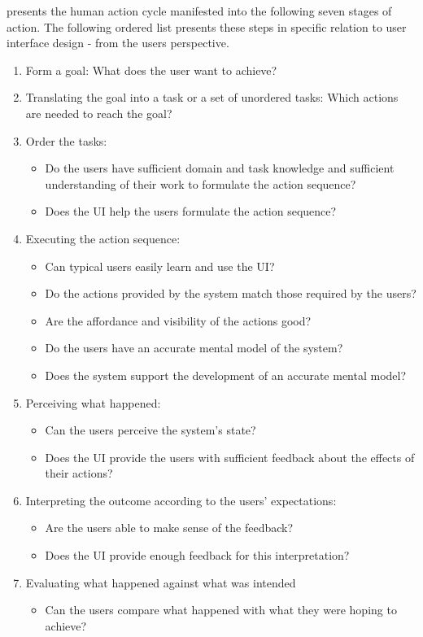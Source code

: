 \documentclass[10pt,oneside]{book}                  %
\begin{document}
\cite{norman2002design} presents the human action cycle manifested into the following seven stages of action. The following ordered list presents these steps in specific relation to user interface design - from the users perspective.
\begin{enumerate}

  \item Form a goal: What does the user want to achieve?
  \item Translating the goal into a task or a set of unordered tasks: Which actions are needed to reach the goal?
  \item Order the tasks: 
  \begin{itemize}
     \item Do the users have sufficient domain and task knowledge and sufficient understanding of their work to formulate the action sequence?

     \item Does the UI help the users formulate the action sequence?

  \end{itemize}  
  \item Executing the action sequence:
  \begin{itemize}
     \item Can typical users easily learn and use the UI?
     \item Do the actions provided by the system match those required by the users?
     \item Are the affordance and visibility of the actions good?
     \item Do the users have an accurate mental model of the system?
     \item Does the system support the development of an accurate mental model?
  \end{itemize}  
  \item Perceiving what happened:
  \begin{itemize}
     \item Can the users perceive the system’s state?
     \item Does the UI provide the users with sufficient feedback about the effects of their actions?
  \end{itemize}  
  \item Interpreting the outcome according to the users’ expectations:
  \begin{itemize}
     \item Are the users able to make sense of the feedback?
     \item Does the UI provide enough feedback for this interpretation?
  \end{itemize}  
  \item Evaluating what happened against what was intended
  \begin{itemize}
     \item Can the users compare what happened with what they were hoping to achieve?
  \end{itemize}  

\end{enumerate}
\end{document}
